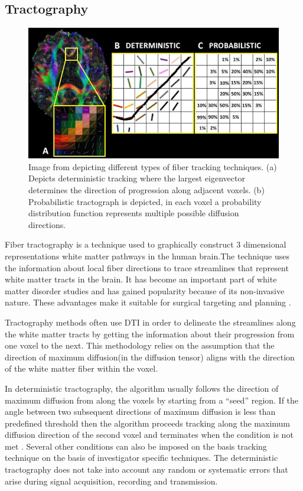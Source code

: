 \documentclass[msthesis.tex]{subfiles}
\begin{document}
\subsection{Tractography}
\label{subsub:tractography}
\begin{figure}
    \centering
    \includegraphics[width=\textwidth]{images/A-Degree-of-anisotropy-B-Deterministic-fiber-tracking-the-fiber-path-across-voxels-is.png}
    \caption{Image from \cite{muller2018clinically} depicting different types of fiber tracking techniques. (a) Depicts deterministic tracking where the largest eigenvector determines the direction of progression along adjacent voxels. (b) Probabilistic tractograph is depicted, in each voxel a probability distribution function represents multiple possible diffusion directions.}
    \label{fig:tracking}
\end{figure}
Fiber tractography is a technique used to graphically construct  3 dimensional representations white matter pathways in the human brain.The technique uses the information about local fiber directions to trace streamlines that represent white matter tracts in the brain. It has become an important part of white matter disorder studies and has gained popularity because of its non-invasive nature. These advantages make it suitable for surgical targeting and planning \cite{romano2009pre}.

Tractography methods often use DTI in order to delineate the streamlines along the white matter tracts by getting the information about their progression from one voxel to the next. This methodology relies on the assumption that the direction of maximum diffusion(in the diffusion tensor) aligns with the direction of the white matter fiber within the voxel. 

In deterministic tractography, the algorithm usually follows the direction of maximum diffusion from along the voxels by starting from a “seed” region. If the angle between two subsequent directions of maximum diffusion is less than predefined threshold then the algorithm proceeds tracking along the maximum diffusion direction of the second voxel and terminates when the condition is not met \cite{}.  Several other conditions can also be imposed on the basis tracking technique on the basis of investigator specific techniques. The deterministic tractography does not take into account any random or systematic errors that arise during signal acquisition, recording and transmission.
\end{document}
